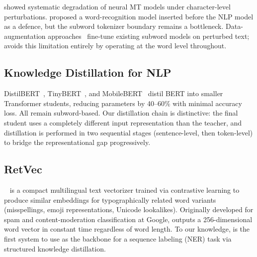 \citet{belinkov2018synthetic} showed systematic degradation of neural MT
models under character-level perturbations.  \citet{pruthi2019combating}
proposed a word-recognition model inserted before the NLP model as a defence,
but the subword tokenizer boundary remains a bottleneck.  Data-augmentation
approaches~\citep{wei2019eda,zhu2020freelb} fine-tune existing subword models
on perturbed text; \LightRet{} avoids this limitation entirely by operating at
the word level throughout.

\subsection{Knowledge Distillation for NLP}

DistilBERT~\citep{sanh2019distilbert}, TinyBERT~\citep{jiao2020tinybert}, and
MobileBERT~\citep{sun2020mobilebert} distil BERT into smaller Transformer
students, reducing parameters by 40--60\% with minimal accuracy loss.  All
remain subword-based.  Our distillation chain is distinctive: the final student
uses a completely different input representation than the teacher, and
distillation is performed in two sequential stages (sentence-level, then
token-level) to bridge the representational gap progressively.

\subsection{RetVec}

\RetVec{}~\citep{sander2023retvec} is a compact multilingual text vectorizer
trained via contrastive learning to produce similar embeddings for
typographically related word variants (misspellings, emoji representations,
Unicode lookalikes).  Originally developed for spam and content-moderation
classification at Google, \RetVec{} outputs a 256-dimensional word vector in
constant time regardless of word length.  To our knowledge, \LightRet{} is the
first system to use \RetVec{} as the backbone for a sequence labeling (NER)
task via structured knowledge distillation.
